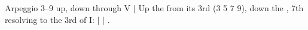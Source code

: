 \begin{patternbox}{Arpeggio 3--9 up, down through V}{  $|$ }
Up the  from its 3rd (3 5 7 9), down the , 7th resolving to the 3rd of I:
 $|$  $|$ .
\patternwhereline
\end{patternbox}
